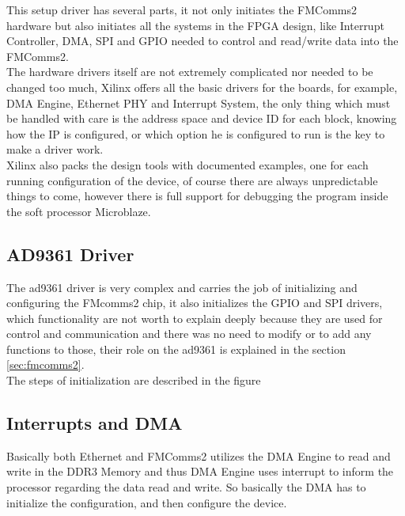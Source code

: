 This setup driver has several parts, it not only initiates the FMComms2 hardware
but also initiates all the systems in the FPGA design, like Interrupt Controller,
 DMA, SPI and GPIO needed to control and read/write data into the FMComms2.\\

The hardware drivers itself are not extremely complicated nor needed to be changed
too much, Xilinx offers all the basic drivers for the boards, for example, DMA Engine,
Ethernet PHY and Interrupt System, the only thing which must be handled with care is
the address space and device ID for each block, knowing how the IP is configured,
or which option he is configured to run is the key to make a driver work.\\

Xilinx also packs the design tools with documented examples, one for each running
configuration of the device, of course there are always unpredictable things to come,
however there is full support for debugging the program inside the soft processor
Microblaze.

\subsection{AD9361 Driver}

The ad9361 driver is very complex and carries the job of initializing and configuring
the FMcomms2 chip, it also initializes the GPIO and SPI drivers, which functionality
are not worth to explain deeply because they are used for control and communication
and there was no need to modify or to add any functions to those, their role on the
ad9361 is explained in the section \ref{sec:fmcomms2}.\\

The steps of initialization are described in the figure %


\subsection{Interrupts and DMA}

Basically both Ethernet and FMComms2 utilizes the DMA Engine to read and write in
the DDR3 Memory and thus DMA Engine uses interrupt to inform the processor regarding
the data read and write. So basically the DMA has to initialize the configuration,
and then configure the device.\\

